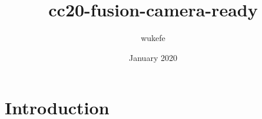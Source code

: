 \documentclass{article}
\title{cc20-fusion-camera-ready}
\author{wukefe }
\date{January 2020}
\begin{document}
\maketitle

\section{Introduction}
\end{document}
